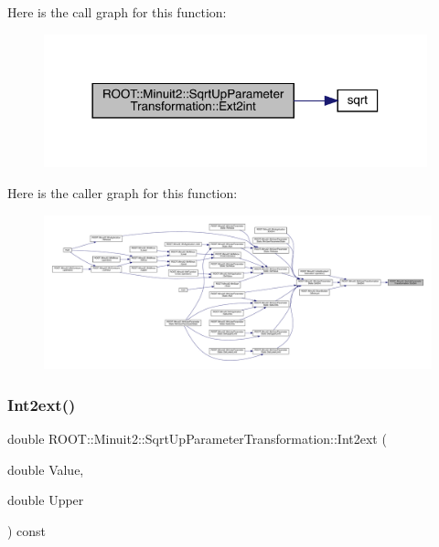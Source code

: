 Here is the call graph for this function\+:\nopagebreak
\begin{figure}[H]
\begin{center}
\leavevmode
\includegraphics[width=314pt]{d4/d77/classROOT_1_1Minuit2_1_1SqrtUpParameterTransformation_a8ba129e1707b752df2b477c5e8459958_cgraph}
\end{center}
\end{figure}
Here is the caller graph for this function\+:\nopagebreak
\begin{figure}[H]
\begin{center}
\leavevmode
\includegraphics[width=350pt]{d4/d77/classROOT_1_1Minuit2_1_1SqrtUpParameterTransformation_a8ba129e1707b752df2b477c5e8459958_icgraph}
\end{center}
\end{figure}
\mbox{\label{classROOT_1_1Minuit2_1_1SqrtUpParameterTransformation_afd65e37e7e03cb9db5bf9906eb399fc8}} 
\subsubsection{\texorpdfstring{Int2ext()}{Int2ext()}\hspace{0.1cm}{\footnotesize\ttfamily [1/2]}}
{\footnotesize\ttfamily double R\+O\+O\+T\+::\+Minuit2\+::\+Sqrt\+Up\+Parameter\+Transformation\+::\+Int2ext (\begin{DoxyParamCaption}\item[{double}]{Value,  }\item[{double}]{Upper }\end{DoxyParamCaption}) const}

